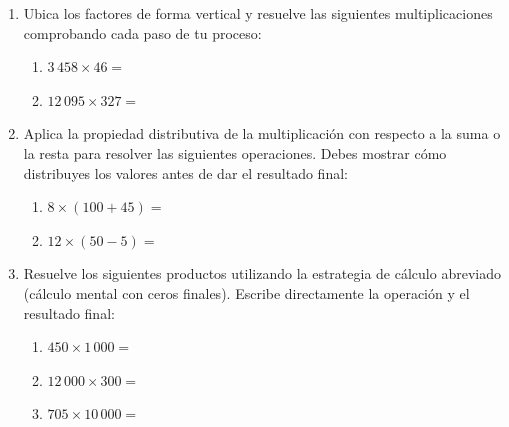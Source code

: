 \documentclass[12pt, letterpaper]{article}
\newif\ifmostrarrespuestas
\newcommand{\respuesta}[1]{%
	\ifmostrarrespuestas
	\par\vspace{0.2cm}%
	\begin{tcolorbox}[
		enhanced,
		colback=valred!5,         %
		colframe=valred,          %
		arc=2mm,                  %
		boxrule=1pt,              %
		title={\small\bfseries\ding{51} Solución / Procedimiento},
		coltitle=white,           %
		boxed title style={colback=valred, arc=1mm}, %
		top=3mm, bottom=3mm, left=3mm, right=3mm %
		]
		#1
	\end{tcolorbox}%
	\par\vspace{0.1cm}%
	\fi
}
\begin{document}
	\begin{enumerate}[itemsep=0.8cm]
		
		\item Ubica los factores de forma vertical y resuelve las siguientes multiplicaciones comprobando cada paso de tu proceso:
		\begin{enumerate}[label=\alph*., itemsep=0.2cm, topsep=0.2cm]
			\item $3\,458 \times 46 = $
			\item $12\,095 \times 327 = $
		\end{enumerate}
		\respuesta{
		\begin{enumerate}
			\item $159\,068$ 
			\item $3\,955\,065$
		\end{enumerate}
		}
		
		\item Aplica la propiedad distributiva de la multiplicación con respecto a la suma o la resta para resolver las siguientes operaciones. Debes mostrar cómo distribuyes los valores antes de dar el resultado final:
		\begin{enumerate}[label=\alph*., itemsep=0.2cm, topsep=0.2cm]
			\item $8 \times (100 + 45) = $
			\item $12 \times (50 - 5) = $
		\end{enumerate}
		\respuesta{
		\begin{enumerate}
			\item $1160$
			\item $540$
		\end{enumerate}
		}
		
		\item Resuelve los siguientes productos utilizando la estrategia de cálculo abreviado (cálculo mental con ceros finales). Escribe directamente la operación y el resultado final:
		\begin{enumerate}[label=\alph*., itemsep=0.2cm, topsep=0.2cm]
			\item $450 \times 1\,000 = $
			\item $12\,000 \times 300 = $
			\item $705 \times 10\,000 = $
		\end{enumerate}
		\respuesta{
		\begin{enumerate}
			\item $450\,000$
			\item $3\,600\,000$
			\item $7\,050\,000$
		\end{enumerate}
		}
		

\end{enumerate}
\end{document}
